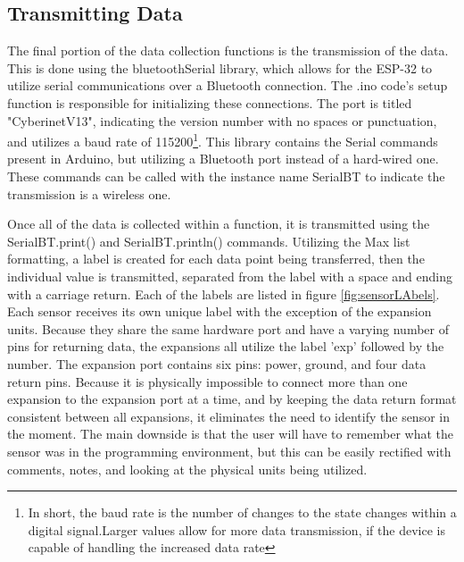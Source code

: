 \subsection{Transmitting Data}
The final portion of the data collection functions is the transmission of the data. This is done using the bluetoothSerial library, which allows for the ESP-32 to utilize serial communications over a Bluetooth connection. The .ino code's setup function is responsible for initializing these connections. The port is titled "CyberinetV13", indicating the version number with no spaces or punctuation, and utilizes a baud rate of 115200\footnote{In short, the baud rate is the number of changes to the state changes within a digital signal.Larger values allow for more data transmission, if the device is capable of handling the increased data rate}. This library contains the Serial commands present in Arduino, but utilizing a Bluetooth port instead of a hard-wired one. These commands can be called with the instance name SerialBT to indicate the transmission is a wireless one.

Once all of the data is collected within a function, it is transmitted using the SerialBT.print() and SerialBT.println() commands. Utilizing the Max list formatting, a label is created for each data point being transferred, then the individual value is transmitted, separated from the label with a space and ending with a carriage return. Each of the labels are listed in figure \ref{fig:sensorLAbels}. Each sensor receives its own unique label with the exception of the expansion units. Because they share the same hardware port and have a varying number of pins for returning data, the expansions all utilize the label 'exp' followed by the number. The expansion port contains six pins: power, ground, and four data return pins. Because it is physically impossible to connect more than one expansion to the expansion port at a time, and by keeping the data return format consistent between all expansions, it eliminates the need to identify the sensor in the moment. The main downside is that the user will have to remember what the sensor was in the programming environment, but this can be easily rectified with comments, notes, and looking at the physical units being utilized. 

